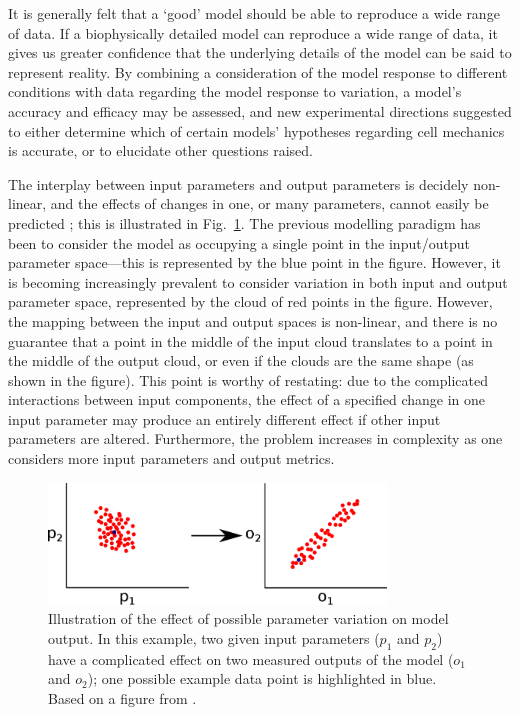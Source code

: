 \documentclass[../thesis-main.tex]{subfiles}
\begin{document}
 It is generally felt that a `good' model should be able to reproduce a wide range of data. If a biophysically detailed model can reproduce a wide range of data, it gives us greater confidence that the underlying details of the model can be said to represent reality. By combining a consideration of the model response to different conditions with data regarding the model response to variation, a model's accuracy and efficacy may be assessed, and new experimental directions suggested to either determine which of certain models' hypotheses regarding cell mechanics is accurate, or to elucidate other questions raised.
 
 The interplay between input parameters and output parameters is decidely non-linear, and the effects of changes in one, or many parameters, cannot easily be predicted \citep{Sarkar2012}; this is illustrated in Fig.~\ref{fig:param-var-effect}. The previous modelling paradigm has been to consider the model as occupying a single point in the input/output parameter space---this is represented by the blue point in the figure. However, it is becoming increasingly prevalent to consider variation in both input and output parameter space, represented by the cloud of red points in the figure. However, the mapping between the input and output spaces is non-linear, and there is no guarantee that a point in the middle of the input cloud translates to a point in the middle of the output cloud, or even if the clouds are the same shape (as shown in the figure). This point is worthy of restating: due to the complicated interactions between input components, the effect of a specified change in one input parameter may produce an entirely different effect if other input parameters are altered. Furthermore, the problem increases in complexity as one considers more input parameters and output metrics.
 \begin{figure}
  \centering
  \includegraphics[width=0.8\textwidth]{param-var-effect}
  \caption[Effect of parameter variation on model output.]{Illustration of the effect of possible parameter variation on model output. In this example, two given input parameters ($p_1$ and $p_2$) have a complicated effect on two measured outputs of the model ($o_1$ and $o_2$); one possible example data point is highlighted in blue. Based on a figure from \citet{Sarkar2012}.}
  \label{fig:param-var-effect}
 \end{figure}
 
\end{document}
